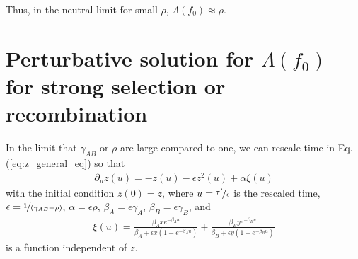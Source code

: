 \documentclass[11pt]{article}
\begin{document}
Thus, in the neutral limit for small $\rho$, $\Lambda(f_0) \approx \rho$.

\section*{Perturbative solution for $\Lambda(f_0)$ for strong selection or recombination}

In the limit that $\gamma_{AB}$ or $\rho$ are large compared to one, we can rescale time in Eq. (\ref{eq:z_general_eq}) so that
\begin{align}\label{eq:z_strong_s}
    \partial_{u} z(u) = -z(u) - \epsilon z^2(u) + \alpha \xi(u)
\end{align}
with the initial condition $z(0) = z$, where $u= \nicefrac{\tau'}{\epsilon}$ is the rescaled time, $\epsilon = \nicefrac{1}{(\gamma_{AB}+\rho)}$, $\alpha = \epsilon \rho$, $\beta_A = \epsilon \gamma_A$, $\beta_B = \epsilon \gamma_B$, and 
\begin{align}
    \xi(u) = \frac{\beta_Axe^{-\beta_A u}}{\beta_A + \epsilon x(1-e^{-\beta_A u})} + \frac{\beta_B ye^{-\beta_B u}}{\beta_B + \epsilon y(1-e^{-\beta_B u})}
\end{align}
is a function independent of $z$.
\end{document}

